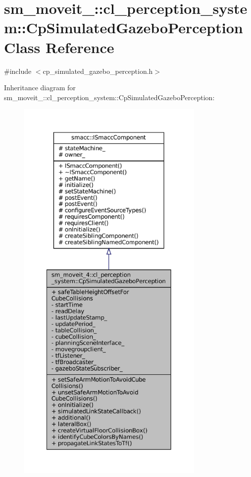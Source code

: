 \hypertarget{classsm__moveit__4_1_1cl__perception__system_1_1CpSimulatedGazeboPerception}{}\section{sm\+\_\+moveit\+\_\+:\+:cl\+\_\+perception\+\_\+system\+:\+:Cp\+Simulated\+Gazebo\+Perception Class Reference}
\label{classsm__moveit__4_1_1cl__perception__system_1_1CpSimulatedGazeboPerception}


{\ttfamily \#include $<$cp\+\_\+simulated\+\_\+gazebo\+\_\+perception.\+h$>$}



Inheritance diagram for sm\+\_\+moveit\+\_\+:\+:cl\+\_\+perception\+\_\+system\+:\+:Cp\+Simulated\+Gazebo\+Perception\+:
\nopagebreak
\begin{figure}[H]
\begin{center}
\leavevmode
\includegraphics[height=550pt]{classsm__moveit__4_1_1cl__perception__system_1_1CpSimulatedGazeboPerception__inherit__graph}
\end{center}
\end{figure}


